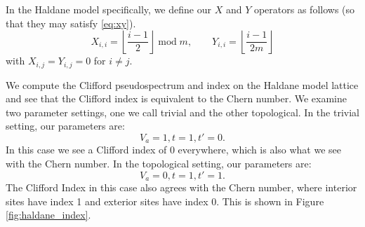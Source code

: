 \documentclass[a4paper]{article}
\begin{document}
In the Haldane model specifically, we define our $X$ and $Y$ operators as follows (so that they may satisfy \eqref{eq:xy}).
\begin{equation}
X_{i,i} = \left\lfloor \frac{i-1}{2} \right\rfloor \;\text{mod}\;m, \quad\quad Y_{i,i} = \left\lfloor \frac{i-1}{2m} \right\rfloor
\end{equation}
with $X_{i,j} = Y_{i,j} = 0$ for $i \neq j$.

We compute the Clifford pseudospectrum and index on the Haldane model lattice and see that the Clifford index is equivalent to the Chern number.
We examine two parameter settings, one we call trivial and the other topological.
In the trivial setting, our parameters are:
\begin{equation}
V_a = 1, t = 1, t' = 0.
\end{equation}
In this case we see a Clifford index of 0 everywhere, which is also what we see with the Chern number.
In the topological setting, our parameters are:
\begin{equation}
V_a = 0, t = 1, t' = 1.
\end{equation}
The Clifford Index in this case also agrees with the Chern number, where interior sites have index 1 and exterior sites have index 0.
This is shown in Figure \ref{fig:haldane_index}.
\end{document}
